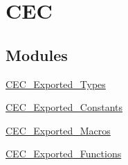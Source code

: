 \hypertarget{group__CEC}{
\section{CEC}
\label{group__CEC}
}
\subsection*{Modules}
\begin{DoxyCompactItemize}
\item 
\hyperlink{group__CEC__Exported__Types}{CEC\_\-Exported\_\-Types}
\item 
\hyperlink{group__CEC__Exported__Constants}{CEC\_\-Exported\_\-Constants}
\item 
\hyperlink{group__CEC__Exported__Macros}{CEC\_\-Exported\_\-Macros}
\item 
\hyperlink{group__CEC__Exported__Functions}{CEC\_\-Exported\_\-Functions}
\end{DoxyCompactItemize}
